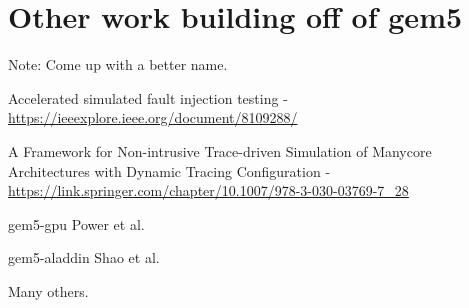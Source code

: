 \section{Other work building off of gem5}

Note: Come up with a better name.

Accelerated simulated fault injection testing - \url{https://ieeexplore.ieee.org/document/8109288/}

A Framework for Non-intrusive Trace-driven Simulation of Manycore Architectures with Dynamic Tracing Configuration - \url{https://link.springer.com/chapter/10.1007/978-3-030-03769-7_28}

gem5-gpu Power et al.

gem5-aladdin Shao et al.

Many others.
